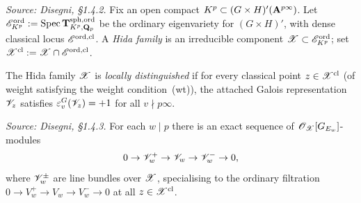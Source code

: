 \begin{definition}
  \label{def:HidaFamily}
  \textit{Source: Disegni, §1.4.2.}
  Fix an open compact $K^p \subset (G \times H)'(\mathbf{A}^{p\infty})$.  Let
  $\mathscr{E}^{\mathrm{ord}}_{K^p} := \mathrm{Spec}\,\mathbf{T}^{\mathrm{sph},\mathrm{ord}}_{K^p,\mathbf{Q}_p}$
  be the ordinary eigenvariety for $(G \times H)'$, with dense classical
  locus $\mathscr{E}^{\mathrm{ord},\mathrm{cl}}$.  A \emph{Hida family} is an irreducible
  component $\mathscr{X} \subset \mathscr{E}^{\mathrm{ord}}_{K^p}$; set
  $\mathscr{X}^{\mathrm{cl}} := \mathscr{X} \cap \mathscr{E}^{\mathrm{ord},\mathrm{cl}}$.

  The Hida family $\mathscr{X}$ is \emph{locally distinguished} if for every
  classical point $z \in \mathscr{X}^{\mathrm{cl}}$ (of weight satisfying the
  weight condition~(wt)), the attached Galois representation
  $\mathscr{V}_z$ satisfies $\varepsilon_v^G(\mathscr{V}_z) = +1$ for all
  $v \nmid p\infty$.
\end{definition}

\begin{lemma}
  \label{lem:OrdinaryReductionAtP}
  \textit{Source: Disegni, §1.4.3.}
  For each $w \mid p$ there is an exact sequence of
  $\mathscr{O}_{\mathscr{X}}[G_{E_w}]$-modules
  \[
    0 \to \mathscr{V}_w^+ \to \mathscr{V}_w \to \mathscr{V}_w^- \to 0,
  \]
  where $\mathscr{V}_w^\pm$ are line bundles over $\mathscr{X}$, specialising to the
  ordinary filtration $0 \to V_w^+ \to V_w \to V_w^- \to 0$ at all
  $z \in \mathscr{X}^{\mathrm{cl}}$.
\end{lemma}

